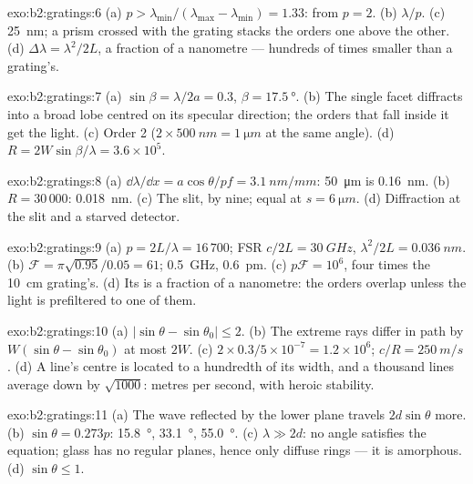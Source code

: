 \begin{solution}{exo:b2:gratings:6}
(a) $p > \lambda_{\min}/(\lambda_{\max} - \lambda_{\min}) = 1.33$: from $p = 2$. (b) $\lambda/p$. (c)
\qty{25}{nm}; a prism crossed with the grating stacks the orders one above
the other. (d) $\Delta\lambda = \lambda^2/2L$, a fraction of a nanometre --- hundreds
of times smaller than a grating's.
\end{solution}

\begin{solution}{exo:b2:gratings:7}
(a) $\sin\beta = \lambda/2a = 0.3$, $\beta = \qty{17.5}{\degree}$. (b) The single facet diffracts
into a broad lobe centred on its specular direction; the orders that
fall inside it get the light. (c) Order 2 ($2 \times \qty{500}{nm} = \qty{1}{\micro m}$ at
the same angle). (d) $R = 2W\sin\beta/\lambda = 3.6 \times 10^5$.
\end{solution}

\begin{solution}{exo:b2:gratings:8}
(a) $\dd\lambda/\dd x = a\cos\theta/pf = \qty{3.1}{nm/mm}$: \qty{50}{\micro m} is \qty{0.16}{nm}. (b)
$R = 30\,000$: \qty{0.018}{nm}. (c) The slit, by nine; equal at $s = \qty{6}{\micro m}$.
(d) Diffraction at the slit and a starved detector.
\end{solution}

\begin{solution}{exo:b2:gratings:9}
(a) $p = 2L/\lambda = 16\,700$; FSR $c/2L = \qty{30}{GHz}$, $\lambda^2/2L = \qty{0.036}{nm}$. (b) $\mathcal F
= \pi\sqrt{0.95}/0.05 = 61$; \qty{0.5}{GHz}, \qty{0.6}{pm}. (c) $p\mathcal F = 10^6$, four
times the \qty{10}{cm} grating's. (d) Its  is a fraction
of a nanometre: the orders overlap unless the light is prefiltered
to one of them.
\end{solution}

\begin{solution}{exo:b2:gratings:10}
(a) $|\sin\theta - \sin\theta_0| \le 2$. (b) The extreme rays differ in path by
$W(\sin\theta - \sin\theta_0)$ at most $2W$. (c) $2 \times 0.3/5 \times 10^{-7} = 1.2 \times 10^6$; $c/R
= \qty{250}{m/s}$. (d) A line's centre is located to a hundredth of its
width, and a thousand lines average down by $\sqrt{1000}$: metres per
second, with heroic stability.
\end{solution}

\begin{solution}{exo:b2:gratings:11}
(a) The wave reflected by the lower plane travels $2d\sin\theta$ more.
(b) $\sin\theta = 0.273p$: \qty{15.8}{\degree}, \qty{33.1}{\degree}, \qty{55.0}{\degree}. (c) $\lambda \gg 2d$:
no angle satisfies the equation; glass has no regular planes, hence
only diffuse rings --- it is amorphous. (d) $\sin\theta \le 1$.
\end{solution}

